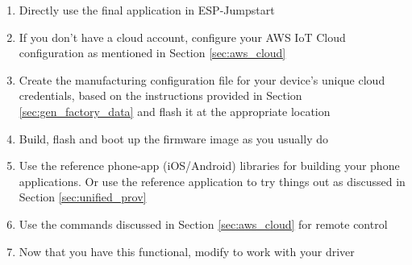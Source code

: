 \documentclass[main.tex]{subfiles}
\begin{document}
\begin{enumerate}
    \item Directly use the final application in ESP-Jumpstart
    \item If you don't have a cloud account, configure your AWS IoT Cloud configuration as mentioned in Section \ref{sec:aws_cloud}
    \item Create the manufacturing configuration file for your device's unique cloud credentials, based on the instructions provided in Section \ref{sec:gen_factory_data} and flash it at the appropriate location
    \item Build, flash and boot up the firmware image as you usually do
    \item Use the reference phone-app (iOS/Android) libraries for building your phone applications. Or use the reference application to try things out as discussed in Section \ref{sec:unified_prov}
    \item Use the commands discussed in Section \ref{sec:aws_cloud} for remote control
    \item Now that you have this functional, modify to work with your driver
\end{enumerate}
\end{document}
